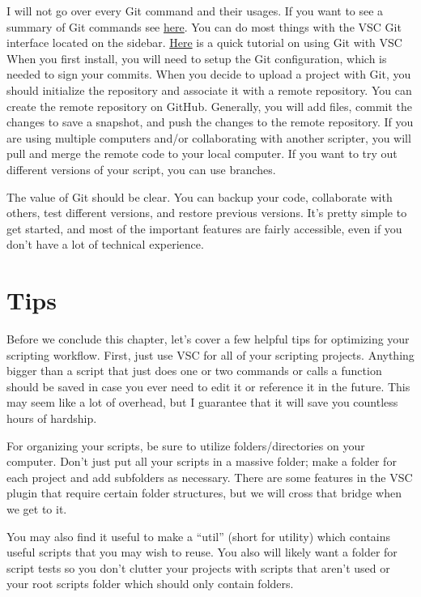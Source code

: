 \documentclass[oneside]{book}
\begin{document}
I will not go over every Git command and their usages. If you want to see a summary of Git commands see \href{https://education.github.com/git-cheat-sheet-education.pdf}{here}. You can do most things with the VSC Git interface located on the sidebar. \href{https://code.visualstudio.com/docs/sourcecontrol/overview}{Here} is a quick tutorial on using Git with VSC When you first install, you will need to setup the Git configuration, which is needed to sign your commits. When you decide to upload a project with Git, you should initialize the repository and associate it with a remote repository. You can create the remote repository on GitHub. Generally, you will add files, commit the changes to save a snapshot, and push the changes to the remote repository. If you are using multiple computers and/or collaborating with another scripter, you will pull and merge the remote code to your local computer. If you want to try out different versions of your script, you can use branches.

The value of Git should be clear. You can backup your code, collaborate with others, test different versions, and restore previous versions. It's pretty simple to get started, and most of the important features are fairly accessible, even if you don't have a lot of technical experience.

\section{Tips}
Before we conclude this chapter, let's cover a few helpful tips for optimizing your scripting workflow. First, just use VSC for all of your scripting projects. Anything bigger than a script that just does one or two commands or calls a function should be saved in case you ever need to edit it or reference it in the future. This may seem like a lot of overhead, but I guarantee that it will save you countless hours of hardship.

For organizing your scripts, be sure to utilize folders/directories on your computer. Don't just put all your scripts in a massive folder; make a folder for each project and add subfolders as necessary. There are some features in the VSC plugin that require certain folder structures, but we will cross that bridge when we get to it.

You may also find it useful to make a ``util'' (short for utility) which contains useful scripts that you may wish to reuse. You also will likely want a folder for script tests so you don't clutter your projects with scripts that aren't used or your root scripts folder which should only contain folders.
\end{document}
